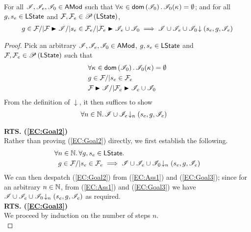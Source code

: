 \begin{lemma}\label{lem:extend-closure}
%
For all $\mathscr{I}, \mathscr{I}_{e}, \mathscr{I}_{0} \in \textsf{AMod}$ such that $\forall \kappa_{} \in \textsf{dom}\left( \mathscr{I}_0 \right).\, \mathscr{I}_0(\kappa_{}) = \emptyset$; and for all $g, s_e \in \textsf{LState}$ and $\mathcal{F}_{}, \mathcal{F}_{e} \in \mathscr{P}\left(\textsf{LState} \right)$,
\[
\begin{array}{l l}
	g \in \fence{} /| \fence{} \strictfences \lmod /| s_e \in \fence{e} /| \fence{e} \strictfences \lmod_e \cup \lmod_0
	\implies  \extendsAM{\lmod \cup \lmod_{e} \cup \lmod_0}{s_{e}}{g}{\lmod_{e}}
\end{array}
\]
%
\begin{proof} Pick an arbitrary $\mathscr{I}, \mathscr{I}_e, \mathscr{I}_0 \in \textsf{AMod}$, $g, s_e \in \textsf{LState}$ and $\mathcal{F}_{}, \mathcal{F}_{e} \in \mathscr{P}\left(\textsf{LState} \right)$ such that 
%
\begin{align}
	& \for{\ca{} \in \dom{\lmod_0}} \lmod_0(\ca{}) = \emptyset \label{EC:Ass0}\\
	& g \in \fence{} /|  s_e \in \fence{e}   \label{EC:Ass1}\\
	& \fence{} \strictfences \lmod /| \fence{e} \strictfences \lmod_e \cup \lmod_0 \label{EC:Ass2}
\end{align} 
%
From the definition of $\downarrow$, it then suffices to show
%
\begin{align}
	& \forall n \in \mathbb{N}.\,  \mathscr{I} \cup \mathscr{I}_e \!\downarrow_{n} \left(s_e, g, \mathscr{I}_e\right) \label{EC:Goal2}
\end{align}
%

\noindent\textbf{RTS. (\ref{EC:Goal2})} \\
Rather than proving (\ref{EC:Goal2}) directly, we first establish the following.
%
\begin{align}
	& \forall n \in \mathbb{N}.\, \forall g, s_e \in \textsf{LState}.\, \nonumber\\
	& \;\; g \in \mathcal{F}_{} /| s_e \in \mathcal{F}_{e} \implies \mathscr{I} \cup \mathscr{I}_e \cup \mathscr{I}_0 \!\downarrow_{n} \left(s_e, g, \mathscr{I}_e\right) \label{EC:Goal3}
\end{align}
%
We can then despatch (\ref{EC:Goal2}) from (\ref{EC:Ass1}) and (\ref{EC:Goal3}); since for an arbitrary $n \in \mathbb{N}$, from (\ref{EC:Ass1}) and (\ref{EC:Goal3}) we have $\mathscr{I} \cup \mathscr{I}_e \cup \mathscr{I}_0 \!\downarrow_{n} \left(s_e, g, \mathscr{I}_e\right)$ as required. \\

\noindent\textbf{RTS. (\ref{EC:Goal3})} \\
We proceed by induction on the number of steps $n$.\\


\end{proof}
\end{lemma}
